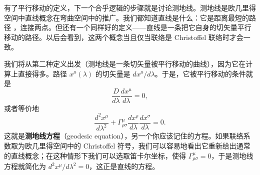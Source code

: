 有了平行移动的定义，下一个合乎逻辑的步骤就是讨论测地线。测地线是欧几里得空间中直线概念在弯曲空间中的推广。我们都知道直线是什么：它是距离最短的路径
，连接两点。但还有一个同样好的定义——直线是一条把它自身的切矢量平行移动的路径。以后会看到，这两个概念当且仅当联络是 Christoffel 联络时才会一致。

我们将从第二种定义出发（测地线是一条切矢量被平行移动的曲线），因为它在计算上直接得多。路径 $x^\mu(\lambda)$ 的切矢量是 $dx^\mu/d\lambda$。于是，它被平行移动的条件就是
\begin{equation*}
\frac{D}{d\lambda}\frac{dx^\mu}{d\lambda} = 0,
\tag{3.43}
\end{equation*}
或者等价地
\begin{equation*}
\boxed{\;\frac{d^2x^\mu}{d\lambda^2} + \Gamma^\mu_{\rho\sigma}\frac{dx^\rho}{d\lambda}\frac{dx^\sigma}{d\lambda} = 0.\;}
\tag{3.44}
\end{equation*}
这就是\textbf{测地线方程}（geodesic equation），另一个你应该记住的方程。如果联络系数取为欧几里得空间中的 Christoffel 符号，我们可以容易地看出它重新给出通常的直线概念；在这种情形下我们可以选取笛卡尔坐标，使得 $\Gamma^\mu_{\rho\sigma} = 0$，于是测地线方程就简化为 $d^2x^\mu/d\lambda^2 = 0$，这正是直线的方程。


